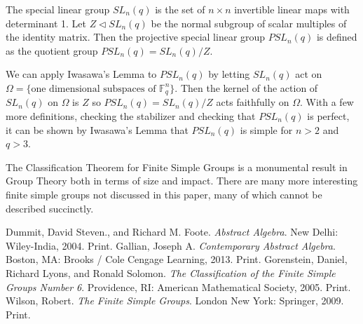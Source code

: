 \documentclass[a4paper]{article}
\begin{document}
\begin{definition}
The special linear group $SL_n(q)$ is the set of $n \times n$ invertible linear maps with determinant 1. Let $Z \triangleleft SL_n(q)$ be the normal subgroup of scalar multiples of the identity matrix. Then the projective special linear group $PSL_n(q)$ is defined as the quotient group $PSL_n(q) = SL_n(q)/Z$.
\end{definition}

We can apply Iwasawa's Lemma to $PSL_n(q)$ by letting $SL_n(q)$ act on $\Omega = \{\text{one dimensional subspaces of } \mathbb{F}^n_q\}$. Then the kernel of the action of $SL_n(q)$ on $\Omega$ is $Z$ so $PSL_n(q) = SL_n(q)/Z$ acts faithfully on $\Omega$. With a few more definitions, checking the stabilizer and checking that $PSL_n(q)$ is perfect, it can be shown by Iwasawa's Lemma that $PSL_n(q)$ is simple for $n > 2$ and $q > 3$.

The Classification Theorem for Finite Simple Groups is a monumental result in Group Theory both in terms of size and impact. There are many more interesting finite simple groups not discussed in this paper, many of which cannot be described succinctly.

\begin{thebibliography}{9}
  Dummit, David Steven., and Richard M. Foote. \emph{Abstract Algebra}. New Delhi: Wiley-India, 2004. Print.
  Gallian, Joseph A. \emph{Contemporary Abstract Algebra}. Boston, MA: Brooks / Cole Cengage Learning, 2013. Print.
  Gorenstein, Daniel, Richard Lyons, and Ronald Solomon. \emph{The Classification of the Finite Simple Groups Number 6}. Providence, RI: American Mathematical Society, 2005. Print.
  Wilson, Robert. \emph{The Finite Simple Groups}. London New York: Springer, 2009. Print.

\end{thebibliography}
\end{document}
